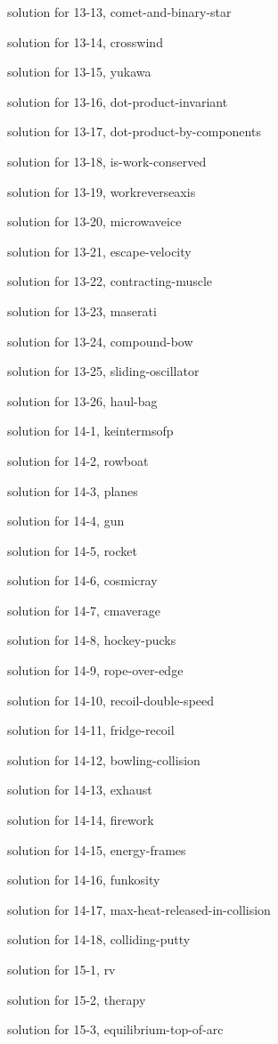 \documentclass{problems}
\begin{document}
solution for 13-13, comet-and-binary-star

solution for 13-14, crosswind

solution for 13-15, yukawa

solution for 13-16, dot-product-invariant

solution for 13-17, dot-product-by-components

solution for 13-18, is-work-conserved

solution for 13-19, workreverseaxis

solution for 13-20, microwaveice

solution for 13-21, escape-velocity

solution for 13-22, contracting-muscle

solution for 13-23, maserati

solution for 13-24, compound-bow

solution for 13-25, sliding-oscillator

solution for 13-26, haul-bag

solution for 14-1, keintermsofp

solution for 14-2, rowboat

solution for 14-3, planes

solution for 14-4, gun

solution for 14-5, rocket

solution for 14-6, cosmicray

solution for 14-7, cmaverage

solution for 14-8, hockey-pucks

solution for 14-9, rope-over-edge

solution for 14-10, recoil-double-speed

solution for 14-11, fridge-recoil

solution for 14-12, bowling-collision

solution for 14-13, exhaust

solution for 14-14, firework

solution for 14-15, energy-frames

solution for 14-16, funkosity

solution for 14-17, max-heat-released-in-collision

solution for 14-18, colliding-putty

solution for 15-1, rv

solution for 15-2, therapy

solution for 15-3, equilibrium-top-of-arc
\end{document}
